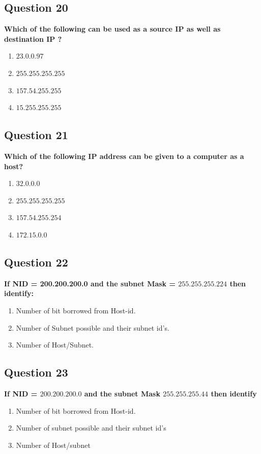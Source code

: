 \documentclass[12pt]{article}
\begin{document}
\subsection*{Question 20}
\textbf{Which of the following can be used as a source IP as well as destination IP ?}
\begin{enumerate}
    \item $23.0.0.97$
    \item $255.255.255.255$
    \item $157.54.255.255$
    \item $15.255.255.255$
\end{enumerate}

\subsection*{Question 21}
\textbf{Which of the following IP address can be given to a computer as a host?}
\begin{enumerate}
    \item $32.0.0.0$
    \item $255.255.255.255$
    \item $157.54.255.254$
    \item $172.15.0.0$
\end{enumerate}

\subsection*{Question 22}
\textbf{If NID = 200.200.200.0 and the subnet Mask = $255.255.255.224$ then identify:}
\begin{enumerate}[label = (\Roman*.)]
    \item Number of bit borrowed from Host-id.
    \item Number of Subnet possible and their subnet id's.
    \item Number of Host/Subnet.
\end{enumerate}

\subsection*{Question 23}
\textbf{If NID = $200.200.200.0$ and the subnet Mask $255.255.255.44$ then identify}
\begin{enumerate}[label = (\Roman*.)]
    \item Number of bit borrowed from Host-id.
    \item Number of subnet possible and their subnet id's
    \item Number of Host/subnet
\end{enumerate}
\end{document}
